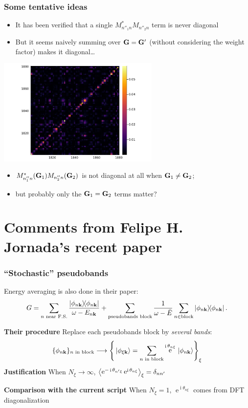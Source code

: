\documentclass[t]{beamer}
\DeclareMathOperator{\ee}{e}
\DeclareMathOperator{\ii}{i}
\begin{document}
\begin{frame}[allowframebreaks]
\frametitle{Some tentative ideas}

\begin{itemize}
    \item It has been verified that a single $M_{n''_1 n}^* M_{n''_2 n}$ term is never diagonal
    \item But it seems naively summing over $\vb{G} = \vb{G}'$ (without considering the weight factor)
    makes it diagonal\dots
\end{itemize}    

\begin{center}
    \includegraphics[width=0.6\textwidth]{../data/sigma/nc_range-1800-1880-n_idx-119-n_prime_idx_119-k_idx-1-q_idx-1-G_range-800-900.png}
\end{center}

\begin{itemize}
    \item $M_{n''_1 n}^*(\vb{G}_1) M_{n''_2 n}(\vb{G}_2)$ is not diagonal at all when $\vb{G}_1 \neq \vb{G}_2$; 
    \item but probably only the $\vb{G}_1 = \vb{G}_2$ terms matter?
\end{itemize}

\end{frame}

\section{Comments from Felipe H. Jornada's recent paper}

\begin{frame}
\frametitle{``Stochastic'' pseudobands}

Energy averaging is also done in their paper:
\[
    G = \sum_{\text{$n$ near F.S.}} \frac{\dyad{\phi_{n \vb{k}}}}{\omega - E_{n \vb{k}}} + \sum_{\text{pseudobands block}} \frac{1}{\omega - \bar{E}} \sum_{n \in \text{block}} \dyad{\phi_{n \vb{k}}}.
\]     

\textbf{Their procedure} Replace each pseudobands block by \emph{several bands}:
\[
    \{\phi_{n \vb{k}}\}_{\text{$n$ in block}} \longrightarrow
    \left\{
        \ket*{\phi_{\xi \vb{k}}} = \sum_{\text{$n$ in block}} 
        \ee^{\ii \theta_{n \xi}} \ket*{\phi_{n \vb{k}}}
    \right\}_\xi
\]
\textbf{Justification} When $N_\xi \to \infty$, 
$\expval{
    \ee^{- \ii \theta_{n' \xi}} \ee^{\ii \theta_{n \xi}}
}_\xi = \delta_{n n'}$

\textbf{Comparison with the current script} When $N_\xi = 1$, 
$\ee^{\ii \theta_{n \xi}}$ comes from DFT diagonalization

\end{frame}
\end{document}
